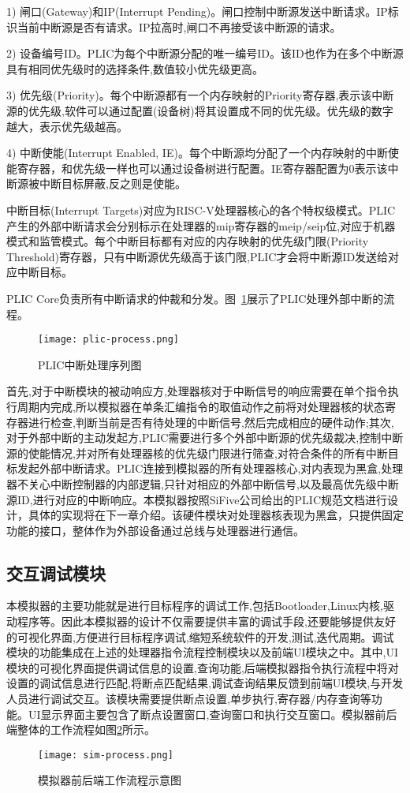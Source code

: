 1) 闸口(Gateway)和IP(Interrupt Pending)。闸口控制中断源发送中断请求。IP标识当前中断源是否有请求。IP拉高时,闸口不再接受该中断源的请求。


2) 设备编号ID。PLIC为每个中断源分配的唯一编号ID。该ID也作为在多个中断源具有相同优先级时的选择条件,数值较小优先级更高。


3) 优先级(Priority)。每个中断源都有一个内存映射的Priority寄存器,表示该中断源的优先级,软件可以通过配置(设备树)将其设置成不同的优先级。优先级的数字越大，表示优先级越高。


4) 中断使能(Interrupt Enabled, IE)。每个中断源均分配了一个内存映射的中断使能寄存器，和优先级一样也可以通过设备树进行配置。IE寄存器配置为0表示该中断源被中断目标屏蔽,反之则是使能。


中断目标(Interrupt Targets)对应为RISC-V处理器核心的各个特权级模式。PLIC产生的外部中断请求会分别标示在处理器的mip寄存器的meip/seip位,对应于机器模式和监管模式。每个中断目标都有对应的内存映射的优先级门限(Priority Threshold)寄存器，只有中断源优先级高于该门限,PLIC才会将中断源ID发送给对应中断目标。


PLIC Core负责所有中断请求的仲裁和分发。图~\ref{fig:plic-process}展示了PLIC处理外部中断的流程。
\begin{figure}[h]
    \centering
    \texttt{[image: plic-process.png]}
    \caption{PLIC中断处理序列图}
    \label{fig:plic-process}
\end{figure}

首先,对于中断模块的被动响应方,处理器核对于中断信号的响应需要在单个指令执行周期内完成,所以模拟器在单条汇编指令的取值动作之前将对处理器核的状态寄存器进行检查,判断当前是否有待处理的中断信号,然后完成相应的硬件动作;其次,对于外部中断的主动发起方,PLIC需要进行多个外部中断源的优先级裁决,控制中断源的使能情况,并对所有处理器核的优先级门限进行筛查,对符合条件的所有中断目标发起外部中断请求。PLIC连接到模拟器的所有处理器核心,对内表现为黑盒,处理器不关心中断控制器的内部逻辑,只针对相应的外部中断信号,以及最高优先级中断源ID,进行对应的中断响应。本模拟器按照SiFive公司给出的PLIC规范文档进行设计，具体的实现将在下一章介绍。该硬件模块对处理器核表现为黑盒，只提供固定功能的接口，整体作为外部设备通过总线与处理器进行通信。

\subsection{交互调试模块}
本模拟器的主要功能就是进行目标程序的调试工作,包括Bootloader,Linux内核,驱动程序等。因此本模拟器的设计不仅需要提供丰富的调试手段,还要能够提供友好的可视化界面,方便进行目标程序调试,缩短系统软件的开发,测试,迭代周期。调试模块的功能集成在上述的处理器指令流程控制模块以及前端UI模块之中。其中,UI模块的可视化界面提供调试信息的设置,查询功能,后端模拟器指令执行流程中将对设置的调试信息进行匹配,将断点匹配结果,调试查询结果反馈到前端UI模块,与开发人员进行调试交互。该模块需要提供断点设置,单步执行,寄存器/内存查询等功能。UI显示界面主要包含了断点设置窗口,查询窗口和执行交互窗口。模拟器前后端整体的工作流程如图\ref{fig:work-frame}所示。
\begin{figure}[H]
  \centering
  \texttt{[image: sim-process.png]}
  \caption{模拟器前后端工作流程示意图}
  \label{fig:work-frame}
\end{figure}

